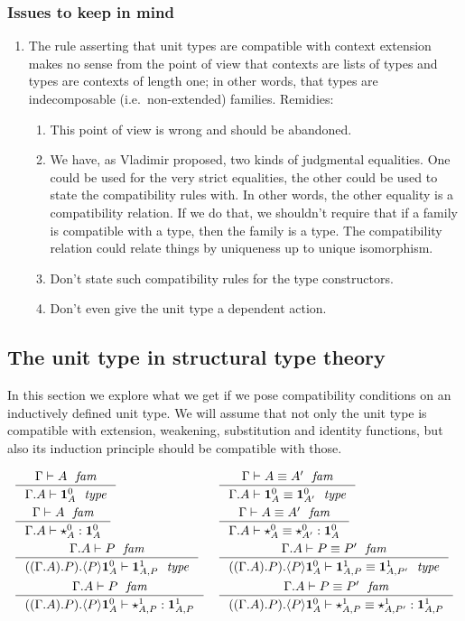 \subsubsection{Issues to keep in mind}
\begin{enumerate}
\item The rule asserting that unit types are compatible with context extension makes
no sense from the point of view that contexts are lists of types and types
are contexts of length one; in other words, that types are indecomposable (i.e.~non-extended)
families. Remidies:
\begin{enumerate}
\item This point of view is wrong and should be abandoned.
\item We have, as Vladimir proposed, two kinds of judgmental equalities. One
      could be used for the very strict equalities, the other could be used
      to state the compatibility rules with. In other words, the other equality
      is a compatibility relation. If we do that, we shouldn't require that
      if a family is compatible with a type, then the family is a type. The
      compatibility relation could relate things by uniqueness up to unique
      isomorphism.
\item Don't state such compatibility rules for the type constructors.
\item Don't even give the unit type a dependent action.
\end{enumerate}
\end{enumerate}

\subsection{The unit type in structural type theory}
In this section we explore what we get if we pose compatibility conditions on
an inductively defined unit type. We will assume that not only the unit type
is compatible with extension, weakening, substitution and identity functions,
but also its induction principle should be compatible with those.

\begin{align*}
& \inference
  {\jfam{\Gamma}{A}}
  {\jtype{{\Gamma}{A}}{\unitc{A}}}
& & \inference
    {\jfameq{\Gamma}{A}{A'}}
    {\jtypeeq{{\Gamma}{A}}
      {\unitc{A}}
      {\unitc{A'}}}\\
& \inference
  {\jfam{\Gamma}{A}}
  {\jterm{{\Gamma}{A}}{\unitc{A}}{\unitct{A}}}
& & \inference
    {\jfameq{\Gamma}{A}{A'}}
    {\jtermeq{{\Gamma}{A}}{\unitc{A}}{\unitct{A}}{\unitct{A'}}}\\
& \inference
  {\jfam{{\Gamma}{A}}{P}}
  {\jtype{{{{\Gamma}{A}}{P}}{\ctxwk{P}{\unitc{A}}}}{\unitf{A}{P}}}
& & \inference
    {\jfameq{{\Gamma}{A}}{P}{P'}}
    {\jtypeeq{{{{\Gamma}{A}}{P}}{\ctxwk{P}{\unitc{A}}}}
      {\unitf{A}{P}}
      {\unitf{A}{P'}}}\\
& \inference
  {\jfam{{\Gamma}{A}}{P}}
  {\jterm{{{{\Gamma}{A}}{P}}{\ctxwk{P}{\unitc{A}}}}{\unitf{A}{P}}{\unitft{A}{P}}}
& & \inference
    {\jfameq{{\Gamma}{A}}{P}{P'}}
    {\jtermeq{{{{\Gamma}{A}}{P}}{\ctxwk{P}{\unitc{A}}}}{\unitf{A}{P}}
      {\unitft{A}{P}}
      {\unitft{A}{P'}}}
\end{align*}

